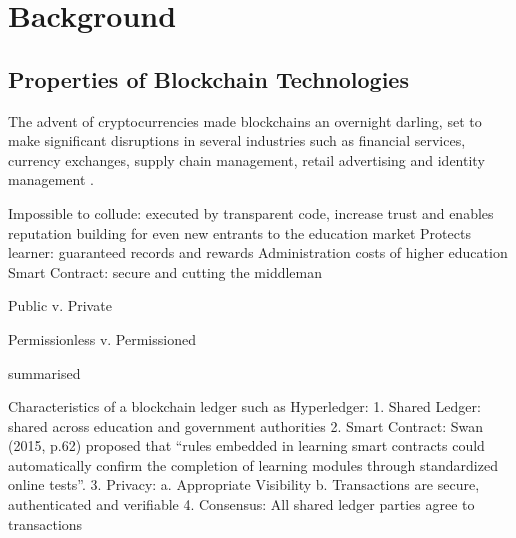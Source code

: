 
\chapter{Background}

    \graphicspath{{Chapter2/Figs/Raster/}{Chapter2/Figs/PDF/}{Chapter2/Figs/}}

\section{Properties of Blockchain Technologies}

The advent of cryptocurrencies made blockchains an overnight darling, set to make significant disruptions 
in several industries such as financial services, currency exchanges, supply chain management, retail 
advertising and identity management \citep{forbes2017industries}.

Impossible to collude: executed by transparent code, increase trust and enables reputation building for even new entrants to 
the education market
Protects learner: guaranteed records and rewards
Administration costs of higher education
Smart Contract: secure and cutting the middleman

Public v. Private 

Permissionless v. Permissioned

\citet{wust2017you} summarised  %


Characteristics of a blockchain ledger such as Hyperledger:
1. Shared Ledger: 
shared across education and government authorities
2. Smart Contract: 
Swan (2015, p.62) proposed that “rules embedded in learning smart contracts could automatically confirm the completion of learning modules 
through standardized online tests”.
3. Privacy: 
a. Appropriate Visibility
b. Transactions are secure, authenticated and verifiable
4. Consensus: All shared ledger parties agree to transactions

